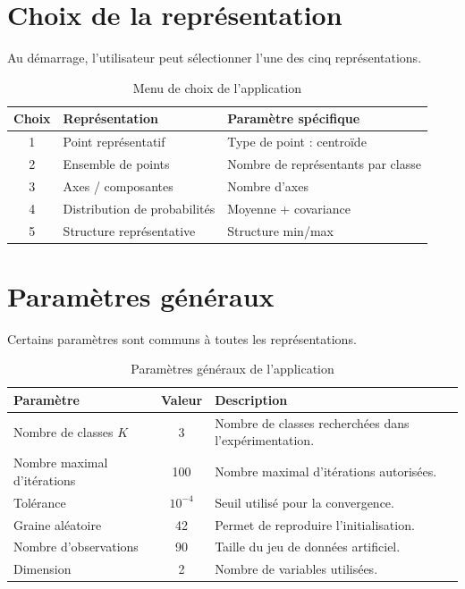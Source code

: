 \documentclass[12pt,a4paper]{report}
\begin{document}
\section{Choix de la représentation}

Au démarrage, l'utilisateur peut sélectionner l'une des cinq
représentations.

\begin{table}[H]
\centering
\caption{Menu de choix de l'application}
\label{tab:menu}
\begin{tabular}{|c|l|l|}
\hline
\textbf{Choix} & \textbf{Représentation} & \textbf{Paramètre spécifique} \\
\hline
1 & Point représentatif & Type de point : centroïde \\
\hline
2 & Ensemble de points & Nombre de représentants par classe \\
\hline
3 & Axes / composantes & Nombre d'axes \\
\hline
4 & Distribution de probabilités & Moyenne + covariance \\
\hline
5 & Structure représentative & Structure min/max \\
\hline
\end{tabular}
\end{table}

\section{Paramètres généraux}

Certains paramètres sont communs à toutes les représentations.

\begin{table}[H]
\centering
\caption{Paramètres généraux de l'application}
\label{tab:parametres}
\begin{tabular}{|l|c|p{7cm}|}
\hline
\textbf{Paramètre} & \textbf{Valeur} & \textbf{Description} \\
\hline
Nombre de classes $K$ & 3 & Nombre de classes recherchées dans l'expérimentation. \\
\hline
Nombre maximal d'itérations & 100 & Nombre maximal d'itérations autorisées. \\
\hline
Tolérance & $10^{-4}$ & Seuil utilisé pour la convergence. \\
\hline
Graine aléatoire & 42 & Permet de reproduire l'initialisation. \\
\hline
Nombre d'observations & 90 & Taille du jeu de données artificiel. \\
\hline
Dimension & 2 & Nombre de variables utilisées. \\
\hline
\end{tabular}
\end{table}
\end{document}
